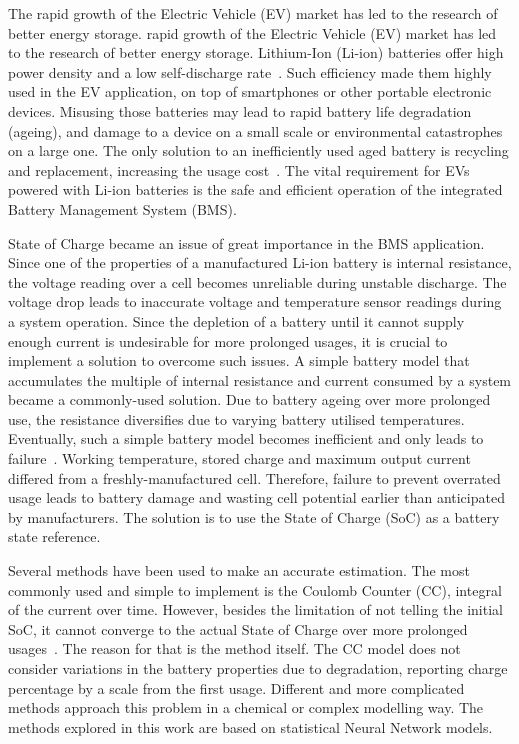 %
{
The rapid growth of the Electric Vehicle (EV) market has led to the research of better energy storage.
} {
 rapid growth of the Electric Vehicle (EV) market has led to the research of better energy storage.
}
Lithium-Ion (Li-ion) batteries offer high power density and a low self-discharge rate~\cite{han_review, en13082106}.
Such efficiency made them highly used in the EV application, on top of smartphones or other portable electronic devices.
Misusing those batteries may lead to rapid battery life degradation (ageing), and damage to a device on a small scale or environmental catastrophes on a large one.
The only solution to an inefficiently used aged battery is recycling and replacement, increasing the usage cost~\cite{skeete_beyond_2020}.
The vital requirement for EVs powered with Li-ion batteries is the safe and efficient operation of the integrated Battery Management System (BMS).

%
State of Charge became an issue of great importance in the BMS application.
Since one of the properties of a manufactured Li-ion battery is internal resistance, the voltage reading over a cell becomes unreliable during unstable discharge.
The voltage drop leads to inaccurate voltage and temperature sensor readings during a system operation.
Since the depletion of a battery until it cannot supply enough current is undesirable for more prolonged usages, it is crucial to implement a solution to overcome such issues.
A simple battery model that accumulates the multiple of internal resistance and current consumed by a system became a commonly-used solution.
Due to battery ageing over more prolonged use, the resistance diversifies due to varying battery utilised temperatures.
Eventually, such a simple battery model becomes inefficient and only leads to failure~\cite{fenrg.2019.00065}.
Working temperature, stored charge and maximum output current differed from a freshly-manufactured cell.
Therefore, failure to prevent overrated usage leads to battery damage and wasting cell potential earlier than anticipated by manufacturers.
The solution is to use the State of Charge (SoC) as a battery state reference.

%
Several methods have been used to make an accurate estimation.
The most commonly used and simple to implement is the Coulomb Counter (CC), integral of the current over time.
However, besides the limitation of not telling the initial SoC, it cannot converge to the actual State of Charge over more prolonged usages~\cite{ng_enhanced_2009}.
The reason for that is the method itself.
The CC model does not consider variations in the battery properties due to degradation, reporting charge percentage by a scale from the first usage.
Different and more complicated methods approach this problem in a chemical or complex modelling way.
The methods explored in this work are based on statistical Neural Network models.

